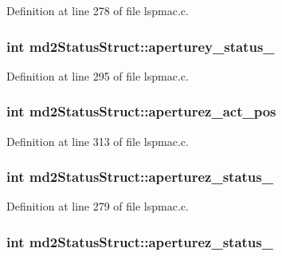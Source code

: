 Definition at line 278 of file lspmac.\-c.

\hypertarget{structmd2StatusStruct_a0a7738f13a0fa80626cafc2299b104b4}{
\subsubsection[{aperturey\-\_\-status\-\_\-2}]{\setlength{\rightskip}{0pt plus 5cm}int md2\-Status\-Struct\-::aperturey\-\_\-status\-\_}}\label{structmd2StatusStruct_a0a7738f13a0fa80626cafc2299b104b4}


Definition at line 295 of file lspmac.\-c.

\hypertarget{structmd2StatusStruct_a62d584ce23cfd9aa626d3c03649b455c}{
\subsubsection[{aperturez\-\_\-act\-\_\-pos}]{\setlength{\rightskip}{0pt plus 5cm}int md2\-Status\-Struct\-::aperturez\-\_\-act\-\_\-pos}}\label{structmd2StatusStruct_a62d584ce23cfd9aa626d3c03649b455c}


Definition at line 313 of file lspmac.\-c.

\hypertarget{structmd2StatusStruct_a27880dd795e1ba4fea4870c64ee3aa84}{
\subsubsection[{aperturez\-\_\-status\-\_\-1}]{\setlength{\rightskip}{0pt plus 5cm}int md2\-Status\-Struct\-::aperturez\-\_\-status\-\_}}\label{structmd2StatusStruct_a27880dd795e1ba4fea4870c64ee3aa84}


Definition at line 279 of file lspmac.\-c.

\hypertarget{structmd2StatusStruct_ae407a99e428d9f4a7444a02c8bc3414e}{
\subsubsection[{aperturez\-\_\-status\-\_\-2}]{\setlength{\rightskip}{0pt plus 5cm}int md2\-Status\-Struct\-::aperturez\-\_\-status\-\_}}\label{structmd2StatusStruct_ae407a99e428d9f4a7444a02c8bc3414e}


